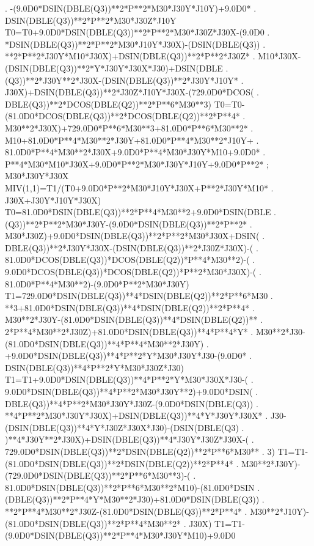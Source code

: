 \begin{framedverbatim}
     . -(9.0D0*DSIN(DBLE(Q3))**2*P**2*M30*J30Y*J10Y)+9.0D0*
     . DSIN(DBLE(Q3))**2*P**2*M30*J30Z*J10Y
      T0=T0+9.0D0*DSIN(DBLE(Q3))**2*P**2*M30*J30Z*J30X-(9.0D0
     . *DSIN(DBLE(Q3))**2*P**2*M30*J10Y*J30X)-(DSIN(DBLE(Q3))
     . **2*P**2*J30Y*M10*J30X)+DSIN(DBLE(Q3))**2*P**2*J30Z*
     . M10*J30X-(DSIN(DBLE(Q3))**2*Y*J30Y*J30X*J30)+DSIN(DBLE
     . (Q3))**2*J30Y**2*J30X-(DSIN(DBLE(Q3))**2*J30Y*J10Y*
     . J30X)+DSIN(DBLE(Q3))**2*J30Z*J10Y*J30X-(729.0D0*DCOS(
     . DBLE(Q3))**2*DCOS(DBLE(Q2))**2*P**6*M30**3)
      T0=T0-(81.0D0*DCOS(DBLE(Q3))**2*DCOS(DBLE(Q2))**2*P**4*
     . M30**2*J30X)+729.0D0*P**6*M30**3+81.0D0*P**6*M30**2*
     . M10+81.0D0*P**4*M30**2*J30Y+81.0D0*P**4*M30**2*J10Y+
     . 81.0D0*P**4*M30**2*J30X+9.0D0*P**4*M30*J30Y*M10+9.0D0*
     . P**4*M30*M10*J30X+9.0D0*P**2*M30*J30Y*J10Y+9.0D0*P**2*
     ; M30*J30Y*J30X
      MIV(1,1)=T1/(T0+9.0D0*P**2*M30*J10Y*J30X+P**2*J30Y*M10*
     . J30X+J30Y*J10Y*J30X)
      T0=81.0D0*DSIN(DBLE(Q3))**2*P**4*M30**2+9.0D0*DSIN(DBLE
     . (Q3))**2*P**2*M30*J30Y-(9.0D0*DSIN(DBLE(Q3))**2*P**2*
     . M30*J30Z)+9.0D0*DSIN(DBLE(Q3))**2*P**2*M30*J30X+DSIN(
     . DBLE(Q3))**2*J30Y*J30X-(DSIN(DBLE(Q3))**2*J30Z*J30X)-(
     . 81.0D0*DCOS(DBLE(Q3))*DCOS(DBLE(Q2))*P**4*M30**2)-(
     . 9.0D0*DCOS(DBLE(Q3))*DCOS(DBLE(Q2))*P**2*M30*J30X)-(
     . 81.0D0*P**4*M30**2)-(9.0D0*P**2*M30*J30Y)
      T1=729.0D0*DSIN(DBLE(Q3))**4*DSIN(DBLE(Q2))**2*P**6*M30
     . **3+81.0D0*DSIN(DBLE(Q3))**4*DSIN(DBLE(Q2))**2*P**4*
     . M30**2*J30Y-(81.0D0*DSIN(DBLE(Q3))**4*DSIN(DBLE(Q2))**
     . 2*P**4*M30**2*J30Z)+81.0D0*DSIN(DBLE(Q3))**4*P**4*Y*
     . M30**2*J30-(81.0D0*DSIN(DBLE(Q3))**4*P**4*M30**2*J30Y)
     . +9.0D0*DSIN(DBLE(Q3))**4*P**2*Y*M30*J30Y*J30-(9.0D0*
     . DSIN(DBLE(Q3))**4*P**2*Y*M30*J30Z*J30)
      T1=T1+9.0D0*DSIN(DBLE(Q3))**4*P**2*Y*M30*J30X*J30-(
     . 9.0D0*DSIN(DBLE(Q3))**4*P**2*M30*J30Y**2)+9.0D0*DSIN(
     . DBLE(Q3))**4*P**2*M30*J30Y*J30Z-(9.0D0*DSIN(DBLE(Q3))
     . **4*P**2*M30*J30Y*J30X)+DSIN(DBLE(Q3))**4*Y*J30Y*J30X*
     . J30-(DSIN(DBLE(Q3))**4*Y*J30Z*J30X*J30)-(DSIN(DBLE(Q3)
     . )**4*J30Y**2*J30X)+DSIN(DBLE(Q3))**4*J30Y*J30Z*J30X-(
     . 729.0D0*DSIN(DBLE(Q3))**2*DSIN(DBLE(Q2))**2*P**6*M30**
     . 3)
      T1=T1-(81.0D0*DSIN(DBLE(Q3))**2*DSIN(DBLE(Q2))**2*P**4*
     . M30**2*J30Y)-(729.0D0*DSIN(DBLE(Q3))**2*P**6*M30**3)-(
     . 81.0D0*DSIN(DBLE(Q3))**2*P**6*M30**2*M10)-(81.0D0*DSIN
     . (DBLE(Q3))**2*P**4*Y*M30**2*J30)+81.0D0*DSIN(DBLE(Q3))
     . **2*P**4*M30**2*J30Z-(81.0D0*DSIN(DBLE(Q3))**2*P**4*
     . M30**2*J10Y)-(81.0D0*DSIN(DBLE(Q3))**2*P**4*M30**2*
     . J30X)
      T1=T1-(9.0D0*DSIN(DBLE(Q3))**2*P**4*M30*J30Y*M10)+9.0D0

\end{framedverbatim}
